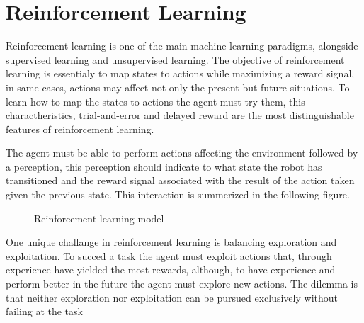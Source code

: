 \section{Reinforcement Learning}
Reinforcement learning is one of the main machine learning paradigms, alongside supervised learning and unsupervised learning. 
The objective of reinforcement learning is essentialy to map states to actions while maximizing a reward signal, in same cases, actions may affect not only the present but future situations. 
To learn how to map the states to actions the agent must try them, this charactheristics, trial-and-error and delayed reward are the most distinguishable features of reinforcement learning.

The agent must be able to perform actions affecting the environment followed by a perception, this perception should indicate to what state the robot has transitioned and the reward signal associated with the result of the action taken given the previous state. This interaction is summerized in the following figure.

\begin{figure}[h]
  \centering
{}
\caption{Reinforcement learning model}
\end{figure}
One unique challange in reinforcement learning is balancing exploration and exploitation.
To succed a task the agent must exploit actions that, through experience have yielded the most rewards, although, 
to have experience and perform better in the future the agent must explore new actions. 
The dilemma is that neither exploration nor exploitation can be pursued exclusively without failing at the task
\cite{reinforcement_learning}

